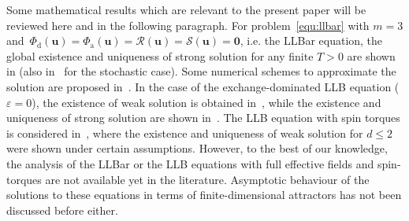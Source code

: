 \documentclass[11pt, reqno]{amsart}
\theoremstyle{definition}
\numberwithin{equation}{section}
\newcommand{\bff}{\boldsymbol}
\newcommand{\bb}{\mathbb}
\begin{document}



Some mathematical results which are relevant to the present paper will be reviewed here and in the following paragraph. For problem~\eqref{equ:llbar} with $m=3$ and~$\Phi_{\mathrm{d}}(\bff{u})= \Phi_{\mathrm{a}}(\bff{u})= \mathcal{R}(\bff{u})= \mathcal{S}(\bff{u})=\bff{0}$, i.e. the LLBar equation, the global existence and uniqueness of strong solution for any finite $T>0$ are shown in \cite{SoeTra23} (also in~\cite{GolSoeTra24b} for the stochastic case). Some numerical schemes to approximate the solution are proposed in~\cite{Soe24, SoeTra23b}. In the case of the exchange-dominated LLB equation ($\varepsilon=0$), the existence of weak solution is obtained in~\cite{Le16}, while the existence and uniqueness of strong solution are shown in~\cite{LeSoeTra24}. The LLB equation with spin torques is considered in~\cite{AyoKotMouZak21}, where the existence and uniqueness of weak solution for $d\leq 2$ were shown under certain assumptions. However, to the best of our knowledge, the analysis of the LLBar or the LLB equations with full effective fields and spin-torques are not available yet in the literature. Asymptotic behaviour of the solutions to these equations in terms of finite-dimensional attractors has not been discussed before either.
\end{document}

